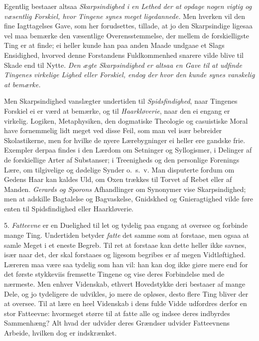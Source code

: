 \documentclass[12pt,a4paper]{article}
\newcommand{\opage}[1]{\marginnote{\footnotesize\textit{[#1]}}}
\begin{document}
Egentlig bestaaer altsaa \emph{Skarpsindighed i en Lethed der at opdage nogen vigtig og
væsentlig Forskiel, hvor Tingene synes meget ligedannede.} Men hverken vil den fine
Iagttagelses Gave, som her forudsettes, tillade, at jo den Skarpsindige ligesaa vel maa
bemærke den væsentlige Overensstemmelse, der mellem de forskielligste Ting er at finde;
ei heller kunde han paa anden Maade undgaae et Slags Ensidighed, hvorved denne Forstandens
Fuldkommenhed snarere vilde blive til Skade end til Nytte. \emph{Den ægte Skarpsindighed
er altsaa en Gave til at udfinde Tingenes virkelige Lighed eller Forskiel, endog
\opage{158} der hvor den kunde synes vanskelig at bemærke.}

Men Skarpsindighed vanslægter undertiden til \emph{Spidsfindighed}, naar Tingenes Forskiel
ei er værd at bemærke, og til \emph{Haarkløverie}, naar den ei engang er virkelig.
Logiken, Metaphysiken, den dogmatiske Theologie og casuistiske Moral have fornemmelig lidt
meget ved disse Feil, som man vel især bebreider Skolastikerne, men for hvilke de nyere
Lærebygninger ei heller ere gandske frie. Exempler derpaa findes i den Lærdom om Setninger
og Syllogismer, i Delinger af de forskiellige Arter af Substanser; i Treenigheds og den
personlige Forenings Lære, om tilgivelige og dødelige Synder o.~s.~v. Man disputerte
fordum om Gedens Haar kan kaldes Uld, om Oxen trækkes til Torvet af Rebet eller af Manden.
\emph{Gerards og Sporons} Afhandlinger om Synonymer vise Skarpsindighed; men at adskille
Bagtalelse og Bagvaskelse, Gnidskhed og Gnieragtighed vilde føre enten til Spidsfindighed
eller Haarkløverie.

5. \emph{Fatteevne} er en Duelighed til let og tydelig paa engang at oversee og forbinde
mange Ting. Undertiden betyder \emph{fatte} det samme som at forstaae, men ogsaa at samle
Meget i et eneste Begreb. Til ret at forstaae kan dette heller ikke savnes, især naar det,
der skal forstaaes og ligesom begribes er af megen Vidtløftighed. Læreren maa være saa
tydelig som han vil: han kan dog ikke giøre mere end for det første stykkeviis
\opage{159} fremsette Tingene og vise deres Forbindelse med de nærmeste. Men enhver Videnskab, ethvert
Hovedstykke deri bestaaer af mange Dele, og jo tydeligere de udvikles, jo mere de opløses,
desto flere Ting bliver der at oversee. Til at lære en heel Videnskab i dens fulde Vidde
udfordres derfor en stor Fatteevne: hvormeget større til at fatte alle og indsee deres
indbyrdes Sammenhæng? Alt hvad der udvider deres Grændser udvider Fatteevnens Arbeide,
hvilken dog er indskrænket.
\end{document}
